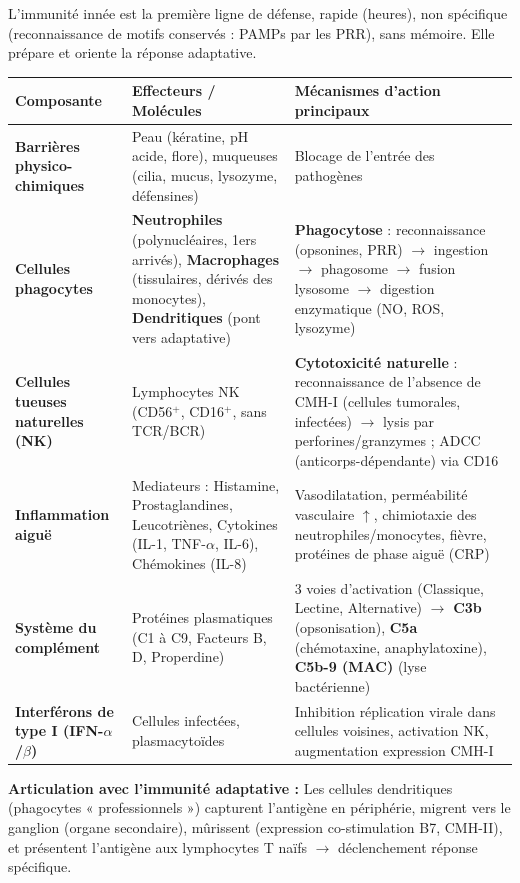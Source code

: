 \documentclass[11pt]{article}
\begin{document}
\begin{propriete}
L'immunité innée est la première ligne de défense, rapide (heures), non spécifique (reconnaissance de motifs conservés : PAMPs par les PRR), sans mémoire. Elle prépare et oriente la réponse adaptative.
\begin{center}
\begin{tabularx}{\linewidth}{|l|X|X|}\hline
\rowcolor{popblueL} \textbf{Composante} & \textbf{Effecteurs / Molécules} & \textbf{Mécanismes d'action principaux} \\ \hline
\textbf{Barrières physico-chimiques} & Peau (kératine, pH acide, flore), muqueuses (cilia, mucus, lysozyme, défensines) & Blocage de l'entrée des pathogènes \\ \hline
\textbf{Cellules phagocytes} & \textbf{Neutrophiles} (polynucléaires, 1ers arrivés), \textbf{Macrophages} (tissulaires, dérivés des monocytes), \textbf{Dendritiques} (pont vers adaptative) & \textbf{Phagocytose} : reconnaissance (opsonines, PRR) $\rightarrow$ ingestion $\rightarrow$ phagosome $\rightarrow$ fusion lysosome $\rightarrow$ digestion enzymatique (NO, ROS, lysozyme) \\ \hline
\textbf{Cellules tueuses naturelles (NK)} & Lymphocytes NK (CD56$^{+}$, CD16$^{+}$, sans TCR/BCR) & \textbf{Cytotoxicité naturelle} : reconnaissance de l'absence de CMH-I (cellules tumorales, infectées) $\rightarrow$ lysis par perforines/granzymes ; ADCC (anticorps-dépendante) via CD16 \\ \hline
\textbf{Inflammation aiguë} & Mediateurs : Histamine, Prostaglandines, Leucotriènes, Cytokines (IL-1, TNF-$\alpha$, IL-6), Chémokines (IL-8) & Vasodilatation, perméabilité vasculaire $\uparrow$, chimiotaxie des neutrophiles/monocytes, fièvre, protéines de phase aiguë (CRP) \\ \hline
\textbf{Système du complément} & Protéines plasmatiques (C1 à C9, Facteurs B, D, Properdine) & 3 voies d'activation (Classique, Lectine, Alternative) $\rightarrow$ \textbf{C3b} (opsonisation), \textbf{C5a} (chémotaxine, anaphylatoxine), \textbf{C5b-9 (MAC)} (lyse bactérienne) \\ \hline
\textbf{Interférons de type I (IFN-$\alpha$/$\beta$)} & Cellules infectées, plasmacytoïdes & Inhibition réplication virale dans cellules voisines, activation NK, augmentation expression CMH-I \\ \hline
\end{tabularx}
\end{center}
\textbf{Articulation avec l'immunité adaptative :} Les cellules dendritiques (phagocytes « professionnels ») capturent l'antigène en périphérie, migrent vers le ganglion (organe secondaire), mûrissent (expression co-stimulation B7, CMH-II), et présentent l'antigène aux lymphocytes T naïfs $\rightarrow$ déclenchement réponse spécifique.
\end{propriete}
\end{document}

